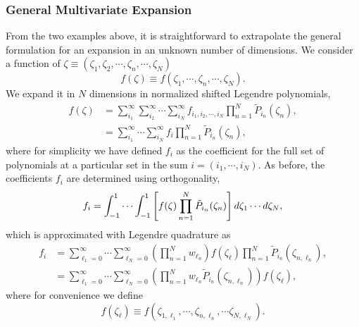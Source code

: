 \subsubsection{General Multivariate Expansion}
From the two examples above, it is straightforward to extrapolate the general formulation for an expansion in an unknown number of dimensions.  We consider a function of $\zeta\equiv(\zeta_1,\zeta_2,\cdots,\zeta_n,\cdots, \zeta_N)$
\begin{equation}
f(\zeta)\equiv f(\zeta_1,\cdots,\zeta_n,\cdots, \zeta_N).
\end{equation}
We expand it in $N$ dimensions in normalized shifted Legendre polynomials,
\begin{align}
f(\zeta)&=\sum_{i_1}^\infty \sum_{i_2}^\infty \cdots\sum_{i_N}^\infty 
        f_{i_1,i_2,\cdots,i_N} \prod_{n=1}^N \tilde P_{i_n}(\zeta_n),\\
 &=\sum_{i_1}^\infty \cdots\sum_{i_N}^\infty
        f_{i} \prod_{n=1}^N \tilde P_{i_n}(\zeta_n),
\end{align}
where for simplicity we have defined $f_i$ as the coefficient for the full set of polynomials at a particular set in the sum $i=(i_1,\cdots,i_N)$.  As before, the coefficients $f_i$ are determined using orthogonality,
\begin{equation}
f_i=\int_{-1}^1 \cdots \int_{-1}^1 \left[f(\zeta)\prod_{n=1}^N \tilde P_{i_n}(\zeta_n)\right] d\zeta_1\cdots d\zeta_N,
\end{equation}
which is approximated with Legendre quadrature as
\begin{align}
f_i&=\sum_{\ell_1=0}^\infty\cdots\sum_{\ell_N=0}^\infty \left(\prod_{n=1}^N w_{\ell_n}\right) 
              f(\zeta_\ell)\prod_{n=1}^N \tilde P_{i_n}(\zeta_{n,\ell_n}),\\
  &=\sum_{\ell_1=0}^\infty\cdots\sum_{\ell_N=0}^\infty \left(\prod_{n=1}^N w_{\ell_n}\tilde P_{i_n}(\zeta_{n,\ell_n})\right) 
              f(\zeta_\ell), 
\end{align}
where for convenience we define
\begin{equation}
f(\zeta_\ell)\equiv f(\zeta_{1,\ell_1},\cdots,\zeta_{n,\ell_n},\cdots\zeta_{N,\ell_N}).
\end{equation}


